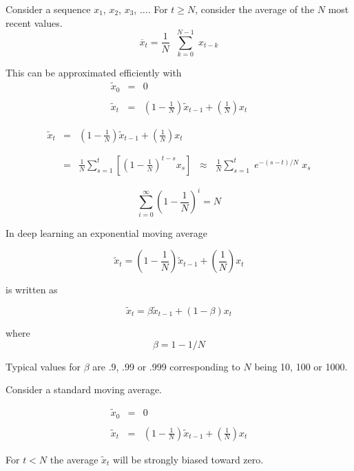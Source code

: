 {
Consider a sequence $x_1$, $x_2$, $x_3$, $\ldots$.
\vfill
For $t \geq N$, consider the average of the $N$ most recent values.
$$\overline{x}_t = \frac{1}{N} \;\; \sum_{k = 0}^{N-1}\; x_{t-k}$$

\vfill
This can be approximated efficiently with
\begin{eqnarray*}
\tilde{x}_0 & = & 0 \\
\\
\tilde{x}_t & = & \left(1-\frac{1}{N}\right)\tilde{x}_{t-1} + \left(\frac{1}{N}\right)x_t
\end{eqnarray*}

\begin{eqnarray*}
\tilde{x}_t & = & \left(1-\frac{1}{N}\right)\tilde{x}_{t-1} + \left(\frac{1}{N}\right)x_t \\
\\
\\
&= & \frac{1}{N}\sum_{s=1}^t \left[\left(1-\frac{1}{N}\right)^{t-s} x_s\right] \;\;\approx\;\; \frac{1}{N} \sum_{s=1}^t\;e^{-(s-t)/N} \;x_s 
\end{eqnarray*}

\vfill
$$\sum_{i=0}^\infty \left(1-\frac{1}{N}\right)^i = N$$


In deep learning an exponential moving average

$$\tilde{x}_t = \left(1-\frac{1}{N}\right)\tilde{x}_{t-1} + \left(\frac{1}{N}\right)x_t$$

\vfill
is written as

$$\tilde{x}_t = \beta\tilde{x}_{t-1} + (1-\beta)x_t$$

\vfill
where
$$\beta = 1 - 1/N$$

\vfill
Typical values for $\beta$ are .9, .99 or .999 corresponding to $N$ being 10, 100 or 1000.


Consider a standard moving average.

\begin{eqnarray*}
\tilde{x}_0 & = & 0 \\
\\
\tilde{x}_t & = & \left(1-\frac{1}{N}\right)\tilde{x}_{t-1} + \left(\frac{1}{N}\right)x_t
\end{eqnarray*}

\vfill
For $t < N$ the average $\tilde{x}_t$ will be strongly biased toward zero.

}
